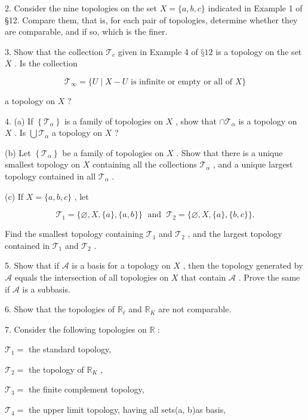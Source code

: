 2. Consider the nine topologies on the set \(X = \{ a,b,c\}\) indicated in Example 1 of §12. Compare them, that is, for each pair of topologies, determine whether they are comparable, and if so, which is the finer.

3. Show that the collection \({\mathcal{T}}_{c}\) given in Example 4 of \(§{12}\) is a topology on the set \(X\) . Is the collection

\[
{\mathcal{T}}_{\infty } = \{ U \mid  X - U\text{ is infinite or empty or all of }X\}
\]

a topology on \(X\) ?

4. (a) If \(\left\{  {\mathcal{T}}_{\alpha }\right\}\) is a family of topologies on \(X\) , show that \(\cap  {\mathcal{T}}_{\alpha }\) is a topology on \(X\) . Is \(\bigcup {\mathcal{T}}_{\alpha }\) a topology on \(X\) ?

(b) Let \(\left\{  {\mathcal{T}}_{\alpha }\right\}\) be a family of topologies on \(X\) . Show that there is a unique smallest topology on \(X\) containing all the collections \({\mathcal{T}}_{\alpha }\) , and a unique largest topology contained in all \({\mathcal{T}}_{\alpha }\) .

(c) If \(X = \{ a,b,c\}\) , let

\[
{\mathcal{T}}_{1} = \{ \varnothing ,X,\{ a\} ,\{ a,b\} \} \;\text{ and }\;{\mathcal{T}}_{2} = \{ \varnothing ,X,\{ a\} ,\{ b,c\} \} .
\]

Find the smallest topology containing \({\mathcal{T}}_{1}\) and \({\mathcal{T}}_{2}\) , and the largest topology contained in \({\mathcal{T}}_{1}\) and \({\mathcal{T}}_{2}\) .

5. Show that if \(\mathcal{A}\) is a basis for a topology on \(X\) , then the topology generated by \(\mathcal{A}\) equals the intersection of all topologies on \(X\) that contain \(\mathcal{A}\) . Prove the same if \(\mathcal{A}\) is a subbasis.

6. Show that the topologies of \({\mathbb{R}}_{\ell }\) and \({\mathbb{R}}_{K}\) are not comparable.

7. Consider the following topologies on \(\mathbb{R}\) :

\({\mathcal{T}}_{1} =\) the standard topology,

\({\mathcal{T}}_{2} =\) the topology of \({\mathbb{R}}_{K}\) ,

\({\mathcal{T}}_{3} =\) the finite complement topology,

\({\mathcal{T}}_{4} =\) the upper limit topology, having all sets(a, b)as basis,

